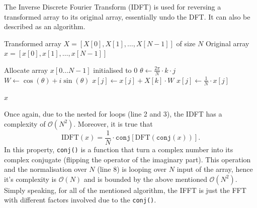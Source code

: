 \documentclass{article}
\begin{document}
The Inverse Discrete Fourier Transform (IDFT) is used for reversing a transformed array to its original array, essentially undo the DFT. It can also be described as an algorithm. 

\begin{algorithm}[H]
\caption{Inverse Discrete Fourier Transform}\label{alg:idft}
\begin{algorithmic}[1]
\Require Transformed array $X = [X[0], X[1], \dots, X[N-1]]$ of size $N$
\Ensure Original array $x = [x[0], x[1], \dots, x[N-1]]$

    \State Allocate array $x[0 \dots N-1]$ initialised to $0$
        \State $\theta \gets \frac{2\pi}{N} \cdot k \cdot j$
        \State $W \gets \cos(\theta) + i\sin(\theta)$
        \State $x[j] \gets x[j] + X[k] \cdot W$
    \EndFor
    \State $x[j] \gets \frac{1}{N} \cdot x[j]$
\EndFor

\State \Return $x$
\EndProcedure
\end{algorithmic}
\end{algorithm}
Once again, due to the nested for loops (line 2 and 3), the IDFT has a complexity of $\mathcal{O}(N^2)$. Moreover, it is true that \begin{equation}\label{eq:1}\text{IDFT}(x) = \frac{1}{N} \cdot \texttt{conj}\left[\text{DFT}(\texttt{conj}(x))\right].\end{equation}
In this property, \texttt{conj()} is a function that turn a complex number into its complex conjugate (flipping the operator of the imaginary part). This operation and the normalisation over $N$ (line 8) is looping over $N$ input of the array, hence it's complexity is $\mathcal{O}(N)$ and is bounded by the above mentioned $\mathcal{O}(N^2)$. Simply speaking, for all of the mentioned algorithm, the IFFT is just the FFT with different factors involved due to the \texttt{conj()}.
\end{document}
